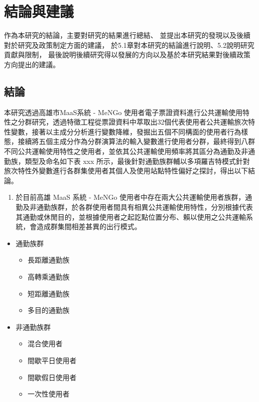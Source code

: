
\providecommand{\tightlist}{%
  \setlength{\itemsep}{0pt}\setlength{\parskip}{0pt}
}

\chapter{結論與建議}\label{ux7d50ux8ad6ux8207ux5efaux8b70}

作為本研究的結論，主要對研究的結果進行總結、
並提出本研究的發現以及後續對於研究及政策制定方面的建議，
於5.1章對本研究的結論進行說明、5.2說明研究貢獻與限制，
最後說明後續研究得以發展的方向以及基於本研究結果對後續政策方向提出的建議。

\section{結論}\label{ux7d50ux8ad6}

本研究透過高雄市MaaS系統 - MeNGo
使用者電子票證資料進行公共運輸使用特性之分群研究，透過特徵工程從票證資料中萃取出32個代表使用者公共運輸旅次特性變數，接著以主成分分析進行變數降維，發掘出五個不同構面的使用者行為樣態，接續將五個主成分作為分群演算法的輸入變數進行使用者分群，最終得到八群不同公共運輸使用特性之使用者，並依其公共運輸使用頻率將其區分為通勤及非通勤族，類型及命名如下表
xxx
所示，最後針對通勤族群輔以多項羅吉特模式針對旅次特性外變數進行各群集使用者其個人及使用站點特性偏好之探討，得出以下結論。

\begin{enumerate}
\def\labelenumi{\arabic{enumi}.}
\tightlist
\item
  於目前高雄 MaaS 系統 - MeNGo
  使用者中存在兩大公共運輸使用者族群，通勤及非通勤族群，於各群使用者間具有相異公共運輸使用特性，分別根據代表其通勤或休閒目的，並根據使用者之起訖點位置分布、賴以使用之公共運輸系統，會造成群集間相差甚異的出行模式。
\end{enumerate}

\begin{itemize}
\tightlist
\item
  通勤族群

  \begin{itemize}
  \tightlist
  \item
    長距離通勤族
  \item
    高轉乘通勤族
  \item
    短距離通勤族
  \item
    多目的通勤族
  \end{itemize}
\item
  非通勤族群

  \begin{itemize}
  \tightlist
  \item
    混合使用者
  \item
    間歇平日使用者
  \item
    間歇假日使用者
  \item
    一次性使用者
  \end{itemize}
\end{itemize}

